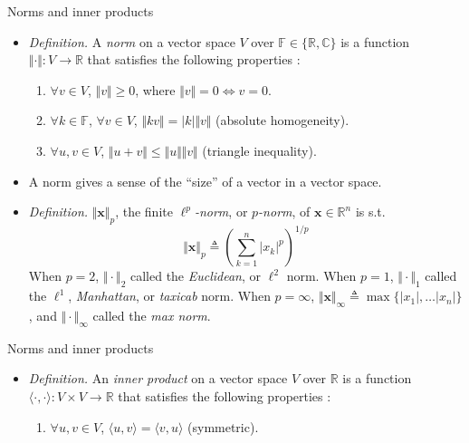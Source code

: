 \documentclass{beamer}
\numberwithin{equation}{section}
\begin{document}
\begin{frame}{Norms and inner products}
    \begin{itemize}
        \item
        \textit{Definition.} A \textit{norm} on a vector space $ V $ over
        $ \mathbb{F} \in \{\mathbb{R}, \mathbb{C}\} $ is a function
        $ \Vert\cdot\Vert : V \rightarrow \mathbb{R} $ that satisfies the
        following properties \cite{jacob_linalg}:
        \begin{enumerate}
            \item
            $ \forall v \in V $, $ \Vert v\Vert \ge 0 $, where
            $ \Vert v\Vert = 0 \Leftrightarrow v = 0 $.

            \item
            $ \forall k \in \mathbb{F} $, $ \forall v \in V $,
            $ \Vert kv\Vert = |k|\Vert v\Vert $ (absolute homogeneity).

            \item
            $ \forall u, v \in V $, $ \Vert u + v\Vert \le
            \Vert u\Vert\Vert v\Vert $ (triangle inequality).
        \end{enumerate}

        \item
        A norm gives a sense of the ``size'' of a vector in a vector space.

        \item
        \textit{Definition.} $ \Vert\mathbf{x}\Vert_p $, the finite
        $ \ell^p $\textit{-norm}, or $ p $\textit{-norm}, of
        $ \mathbf{x} \in \mathbb{R}^n $ is s.t.
        \begin{equation*}
            \Vert\mathbf{x}\Vert_p \triangleq
            \left(\sum_{k = 1}^n|x_k|^p\right)^{1 / p}
        \end{equation*}
        When $ p = 2 $, $ \Vert\cdot\Vert_2 $ called the \textit{Euclidean},
        or $ \ell^2 $ norm. When $ p = 1 $, $ \Vert\cdot\Vert_1 $ called the
        $ \ell^1 $, \textit{Manhattan}, or \textit{taxicab} norm. When
        $ p = \infty $, $ \Vert\mathbf{x}\Vert_\infty \triangleq
        \max\{|x_1|, \ldots |x_n|\} $, and $ \Vert\cdot\Vert_\infty $ called
        the \textit{max norm}.
    \end{itemize}
\end{frame}

\begin{frame}{Norms and inner products}
    \begin{itemize}
        \item
        \textit{Definition.} An \textit{inner product} on a vector space $ V $
        over $ \mathbb{R} $ is a function $ \langle\cdot, \cdot\rangle :
        V \times V \rightarrow \mathbb{R} $ that satisfies the following
        properties \cite{jacob_linalg}:
        \begin{enumerate}
            \item
            $ \forall u, v \in V $, $ \langle u, v\rangle =
            \langle v, u\rangle $ (symmetric).
        \end{enumerate}
    \end{itemize}
\end{frame}
\end{document}
